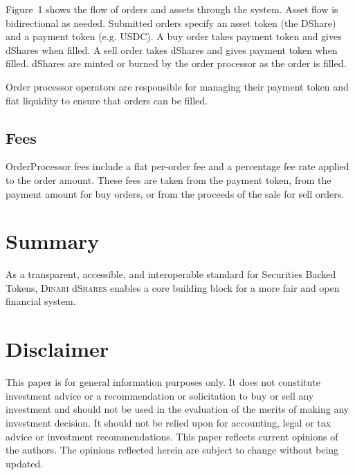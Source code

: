 \documentclass[sigconf,nonacm,prologue,table]{acmart}
\newcommand{\dshares}{\textsc{Dinari} d\textsc{Shares} }
\begin{document}
Figure~1 shows the flow of orders and assets through the system. Asset flow is bidirectional as needed. Submitted orders specify an asset token (the DShare) and a payment token (e.g. USDC). A buy order takes payment token and gives dShares when filled. A sell order takes dShares and gives payment token when filled. dShares are minted or burned by the order processor as the order is filled. 

Order processor operators are responsible for managing their payment token and fiat liquidity to ensure that orders can be filled.

\subsection{Fees}

OrderProcessor fees include a flat per-order fee and a percentage fee rate applied to the order amount. These fees are taken from the payment token, from the payment amount for buy orders, or from the proceeds of the sale for sell orders.

\section{Summary}

As a transparent, accessible, and interoperable standard for Securities Backed Tokens, \dshares enables a core building block for a more fair and open financial system.

% 
% 

\section*{Disclaimer}

This paper is for general information purposes only. It does not constitute investment advice or a recommendation or solicitation to buy or sell any investment and should not be used in the evaluation of the merits of making any investment decision. It should not be relied upon for accounting, legal or tax advice or investment recommendations.  This paper reflects current opinions of the authors. The opinions reflected herein are subject to change without being updated. 
\end{document}
